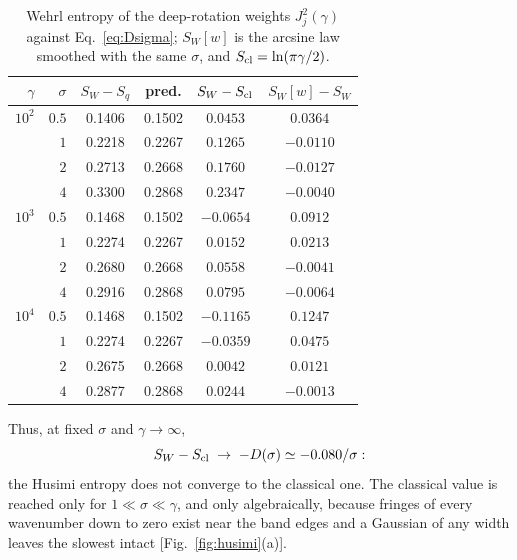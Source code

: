 \documentclass[pra,twocolumn,superscriptaddress,longbibliography,floatfix]{revtex4-2}
\newcommand{\Scl}{S_{\rm cl}}
\newcommand{\SW}{S_{W}}
\begin{document}
\begin{table}[t]
\caption{Wehrl entropy of the deep-rotation weights $J_{j}^{2}(\gamma)$ against
Eq.~\eqref{eq:Dsigma}; $\SW[w]$ is the arcsine law smoothed with the same
$\sigma$, and $\Scl=\ln(\pi\gamma/2)$.}
\label{tab:husimi_rot}
\footnotesize
\setlength{\tabcolsep}{1pt}
\begin{ruledtabular}
\begin{tabular}{rrcccc}
$\gamma$ & $\sigma$ & $\SW-S_{q}$ & pred. & $\SW-\Scl$ &
$\SW[w]-\SW$\\
\hline
$10^{2}$ & $0.5$ & 0.1406 & 0.1502 & $0.0453$ & $0.0364$\\
         & $1$   & 0.2218 & 0.2267 & $0.1265$ & $-0.0110$\\
         & $2$   & 0.2713 & 0.2668 & $0.1760$ & $-0.0127$\\
         & $4$   & 0.3300 & 0.2868 & $0.2347$ & $-0.0040$\\
$10^{3}$ & $0.5$ & 0.1468 & 0.1502 & $-0.0654$ & $0.0912$\\
         & $1$   & 0.2274 & 0.2267 & $0.0152$ & $0.0213$\\
         & $2$   & 0.2680 & 0.2668 & $0.0558$ & $-0.0041$\\
         & $4$   & 0.2916 & 0.2868 & $0.0795$ & $-0.0064$\\
$10^{4}$ & $0.5$ & 0.1468 & 0.1502 & $-0.1165$ & $0.1247$\\
         & $1$   & 0.2274 & 0.2267 & $-0.0359$ & $0.0475$\\
         & $2$   & 0.2675 & 0.2668 & $0.0042$ & $0.0121$\\
         & $4$   & 0.2877 & 0.2868 & $0.0244$ & $-0.0013$\\
\end{tabular}
\end{ruledtabular}
\end{table}

Thus, at fixed $\sigma$ and $\gamma\to\infty$,
\begin{equation}
\SW-\Scl\;\to\;-D(\sigma)\simeq-0.080/\sigma :
\label{eq:SWScl}
\end{equation}
the Husimi entropy does not converge to the classical one. The classical value is
reached only for $1\ll\sigma\ll\gamma$, and only algebraically, because fringes
of every wavenumber down to zero exist near the band edges and a Gaussian of any
width leaves the slowest intact [Fig.~\ref{fig:husimi}(a)].
\end{document}
